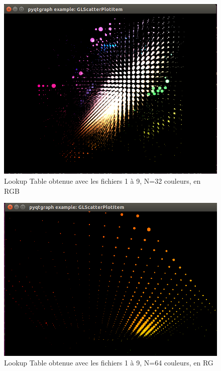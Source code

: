 \documentclass[a4paper,11pt]{article}
\begin{document}
\begin{figure}[H]
\begin{center}
    \includegraphics[scale=0.5]{lT_1_9_8_RGB.png}
    \caption{Lookup Table obtenue avec les fichiers 1 à 9, N=32 couleurs, en RGB}
\end{center}
\end{figure}

\begin{figure}[H]
\begin{center}
    \includegraphics[scale=0.5]{lT_1_9_4_RG.png}
    \caption{Lookup Table obtenue avec les fichiers 1 à 9, N=64 couleurs, en RG}
\end{center}
\end{figure}
\end{document}
